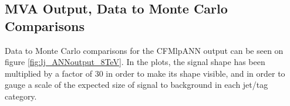\subsection{MVA Output, Data to Monte Carlo Comparisons}
\label{mva_input_vars_data_to_mc_overview}

\par Data to Monte Carlo comparisons for the CFMlpANN output can be
seen on figure \ref{fig:lj_ANNoutput_8TeV}.  In the plots, the signal
shape has been multiplied by a factor of 30 in order to make its shape
visible, and in order to gauge a scale of the expected size of signal
to background in each jet/tag category.  

%
%

